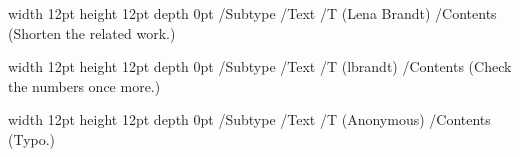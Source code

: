 

\visibleintro
\pdfannot width 12pt height 12pt depth 0pt {/Subtype /Text /T (Lena Brandt) /Contents (Shorten the related work.)}
\pdfannot width 12pt height 12pt depth 0pt {/Subtype /Text /T (lbrandt) /Contents (Check the numbers once more.)}
\pdfannot width 12pt height 12pt depth 0pt {/Subtype /Text /T (Anonymous) /Contents (Typo.)}

